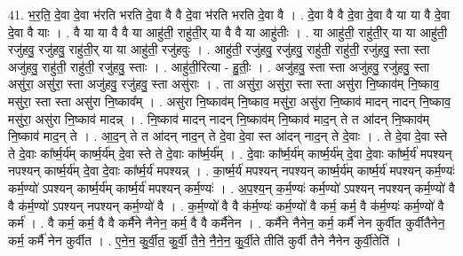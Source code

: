 \documentclass[17pt]{extarticle}
\begin{document}
41. भ॒र॒ति॒ दे॒वा दे॒वा भ॑रति भरति दे॒वा वै वै दे॒वा भ॑रति भरति दे॒वा वै । . दे॒वा वै वै दे॒वा दे॒वा वै या या वै दे॒वा दे॒वा वै याः । . वै या या वै वै या आहु॑ती॒ राहु॑ती॒र् या वै वै या आहु॑तीः । . या आहु॑ती॒ राहु॑ती॒र् या या आहु॑ती॒ रजु॑हवु॒ रजु॑हवु॒ राहु॑ती॒र् या या आहु॑ती॒ रजु॑हवुः । . आहु॑ती॒ रजु॑हवु॒ रजु॑हवु॒ राहु॑ती॒ राहु॑ती॒ रजु॑हवु॒ स्ता स्ता अजु॑हवु॒ राहु॑ती॒ राहु॑ती॒ रजु॑हवु॒ स्ताः । . आहु॑ती॒रित्या - हु॒तीः॒ । . अजु॑हवु॒ स्ता स्ता अजु॑हवु॒ रजु॑हवु॒ स्ता असु॑रा॒ असु॑रा॒ स्ता अजु॑हवु॒ रजु॑हवु॒ स्ता असु॑राः । . ता असु॑रा॒ असु॑रा॒ स्ता स्ता असु॑रा नि॒ष्काव॑म् नि॒ष्काव॒ मसु॑रा॒ स्ता स्ता असु॑रा नि॒ष्काव᳚म् । . असु॑रा नि॒ष्काव॑म् नि॒ष्काव॒ मसु॑रा॒ असु॑रा नि॒ष्काव॑ मादन् नादन् नि॒ष्काव॒ मसु॑रा॒ असु॑रा नि॒ष्काव॑ मादन्न् । . नि॒ष्काव॑ मादन् नादन् नि॒ष्काव॑म् नि॒ष्काव॑ माद॒न् ते त आ॑दन् नि॒ष्काव॑म् नि॒ष्काव॑ माद॒न् ते । . आ॒द॒न् ते त आ॑दन् नाद॒न् ते दे॒वा दे॒वा स्त आ॑दन् नाद॒न् ते दे॒वाः । . ते दे॒वा दे॒वा स्ते ते दे॒वाः का᳚र्ष्म॒र्य॑म् कार्ष्म॒र्य॑म् दे॒वा स्ते ते दे॒वाः का᳚र्ष्म॒र्य᳚म् । . दे॒वाः का᳚र्ष्म॒र्य॑म् कार्ष्म॒र्य॑म् दे॒वा दे॒वाः का᳚र्ष्म॒र्य॑ मपश्यन् नपश्यन् कार्ष्म॒र्य॑म् दे॒वा दे॒वाः का᳚र्ष्म॒र्य॑ मपश्यन्न् । . का॒र्ष्म॒र्य॑ मपश्यन् नपश्यन् कार्ष्म॒र्य॑म् कार्ष्म॒र्य॑ मपश्यन् कर्म॒ण्यः॑ कर्म॒ण्यो॑ ऽपश्यन् कार्ष्म॒र्य॑म् कार्ष्म॒र्य॑ मपश्यन् कर्म॒ण्यः॑ । . अ॒प॒श्य॒न् क॒र्म॒ण्यः॑ कर्म॒ण्यो॑ ऽपश्यन् नपश्यन् कर्म॒ण्यो॑ वै वै क॑र्म॒ण्यो॑ ऽपश्यन् नपश्यन् कर्म॒ण्यो॑ वै । . क॒र्म॒ण्यो॑ वै वै क॑र्म॒ण्यः॑ कर्म॒ण्यो॑ वै कर्म॒ कर्म॒ वै क॑र्म॒ण्यः॑ कर्म॒ण्यो॑ वै कर्म॑ । . वै कर्म॒ कर्म॒ वै वै कर्मै॑ने नैनेन॒ कर्म॒ वै वै कर्मै॑नेन । . कर्मै॑ने नैनेन॒ कर्म॒ कर्मै॑ नेन कुर्वीत कुर्वीतैनेन॒ कर्म॒ कर्मै॑ नेन कुर्वीत । . ए॒ने॒न॒ कु॒र्वी॒त॒ कु॒र्वी॒ तै॒ने॒ नै॒ने॒न॒ कु॒र्वी॒ते तीति॑ कुर्वी तैने नैनेन कुर्वी॒तेति॑ । \newline
\end{document}

